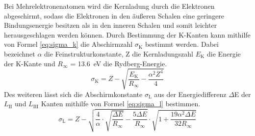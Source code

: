 Bei Mehrelektronenatomen wird die Kernladung durch die Elektronen
abgeschirmt, sodass die Elektronen in den äußeren Schalen eine geringere
Bindungsenergie besitzen als in den inneren Schalen und somit leichter
herausgeschlagen werden können. Durch Bestimmung der K-Kanten kann
mithilfe von Formel \eqref{eq:sigma_k} die Abschirmzahl
$\sigma_\text{K}$ bestimmt werden. Dabei bezeichnet $\alpha$ die
Feinstrukturkonstante, Z die Kernladungszahl $E_\text{K}$ die Energie
der K-Kante und $R_\infty$ = \SI{13.6}{\electronvolt} die
Rydberg-Energie.
%
\begin{equation}
\sigma_\text{K} = Z - \sqrt{\frac{E_\text{K}}{R_\infty} - \frac{\alpha^2 Z^4}{4}}
\label{eq:sigma_k}
\end{equation}
% 
Des weiteren lässt sich die Abschirmkonstante $\sigma_\text{L}$ aus der
Energiedifferenz $\Delta$E der $L_\mathrm{II}$ und $L_\mathrm{III}$
Kanten mithilfe von Formel \eqref{eq:sigma_l} bestimmen.
%
\begin{equation}
\sigma_\text{L} = Z - \sqrt{\frac{4}{\alpha} \cdot \sqrt{\frac{\Delta E}{R_\infty}} - \frac{5 \Delta E}{R_\infty}} \cdot \sqrt{ 1 + \frac{19 \alpha ^2 \Delta E}{32 R_\infty}}
\label{eq:sigma_l}
\end{equation}
%